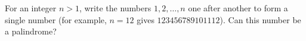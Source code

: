 For an integer $n>1$, write the numbers $1,2,\dots,n$ one after another to form a single number (for example, $n=12$ gives $123456789101112$). Can this number be a palindrome?
